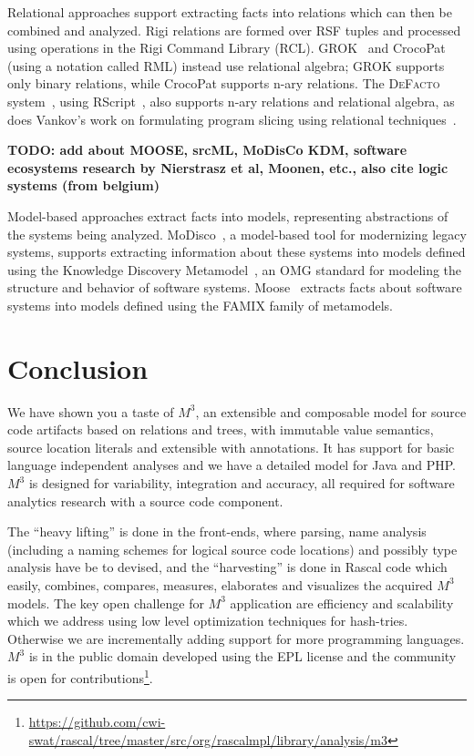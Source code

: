 \documentclass[conference]{IEEEtran}
\newcommand{\Rascal}{\textsc{Rascal}}
\newcommand{\DeFacto}{\textsc{DeFacto}\xspace}
\newcommand{\mthree}{\ensuremath{M^3}\xspace}
\begin{document}
Relational approaches support extracting facts into relations which can then
be combined and analyzed. Rigi relations are formed over RSF tuples and
processed using operations in the Rigi Command Library (RCL).
GROK~\cite{Holt96} and CrocoPat~\cite{BeyerEtAl03,beyer05efficient} (using a
notation called RML) instead use relational algebra; GROK supports only binary
relations, while CrocoPat supports n-ary relations. The \DeFacto
system~\cite{DBLP:conf/sle/BastenK08}, using RScript~\cite{KlintRscript}, also
supports n-ary relations and relational algebra, as does Vankov's work on
formulating program slicing using relational techniques~\cite{Vankov05}.

\textbf{TODO: add about MOOSE, srcML, MoDisCo KDM, software ecosystems research by Nierstrasz et al, Moonen, etc., also cite logic systems (from belgium)}

Model-based approaches extract facts into models, representing abstractions of
the systems being analyzed. MoDisco~\cite{DBLP:journals/infsof/BruneliereCDM14,DBLP:conf/kbse/BruneliereCJM10},
a model-based tool for modernizing legacy
systems, supports extracting information about these systems into models
defined using the Knowledge Discovery Metamodel~\cite{omg-kdm}, an OMG
standard for modeling the structure and behavior of software systems. 
Moose~\cite{DBLP:conf/sigsoft/NierstraszDG05,DBLP:journals/sigsoft/Nierstrasz12}
extracts facts about software systems into models defined using the FAMIX
family of metamodels.

\section{Conclusion}

We have shown you a taste of \mthree, an extensible and composable model for
source code artifacts based on relations and trees, with immutable value
semantics, source location literals and extensible with annotations. It has
support for basic language independent analyses and we have a detailed model
for Java and PHP. \mthree is designed for variability, integration and accuracy, all required for software analytics research with a source code component.

The ``heavy lifting'' is done in the front-ends, where parsing, name analysis (including a naming schemes for logical source code locations) and possibly type analysis have be to devised, and the ``harvesting'' is done in Rascal code which easily, combines, compares, measures, elaborates and visualizes the acquired \mthree models. The key open challenge for \mthree application are efficiency and scalability which we address using low level optimization techniques for hash-tries. Otherwise we are incrementally adding support for more programming languages. \mthree is in the public domain developed using the EPL license and the community is open for contributions\footnote{\url{https://github.com/cwi-swat/rascal/tree/master/src/org/rascalmpl/library/analysis/m3}}.



\end{document}

